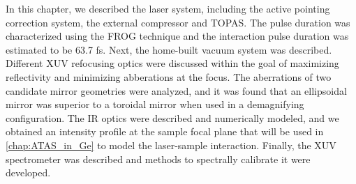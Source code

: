 In this chapter, we described the laser system, including the active pointing correction system, the external compressor and TOPAS. The pulse duration was characterized using the FROG technique and the interaction pulse duration was estimated to be 63.7 fs. Next, the home-built vacuum system was described. Different XUV refocusing optics were discussed within the goal of maximizing reflectivity and minimizing abberations at the focus. The aberrations of two candidate mirror geometries were analyzed, and it was found that an ellipsoidal mirror was superior to a toroidal mirror when used in a demagnifying configuration. The IR optics were described and numerically modeled, and we obtained an intensity profile at the sample focal plane that will be used in \cref{chap:ATAS_in_Ge} to model the laser-sample interaction. Finally, the XUV spectrometer was described and methods to spectrally calibrate it were developed.